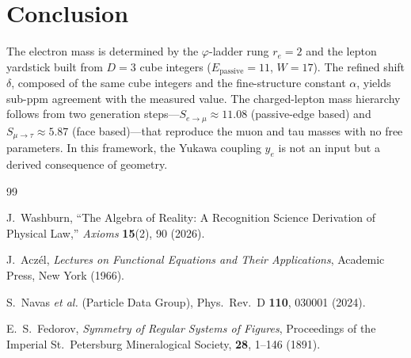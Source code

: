\documentclass[12pt,a4paper]{article}
\theoremstyle{definition}
\theoremstyle{remark}
\begin{document}
\section{Conclusion}
\label{sec:conclusion}

The electron mass is determined by the $\varphi$-ladder rung
$r_e = 2$ and the lepton yardstick built from $D = 3$ cube
integers ($E_{\mathrm{passive}} = 11$, $W = 17$).  The refined
shift $\delta$, composed of the same cube integers and the
fine-structure constant $\alpha$, yields sub-ppm agreement with
the measured value.  The charged-lepton mass hierarchy follows
from two generation steps---$S_{e \to \mu} \approx 11.08$
(passive-edge based) and $S_{\mu \to \tau} \approx 5.87$
(face based)---that reproduce the muon and tau masses with no
free parameters.  In this framework, the Yukawa coupling $y_e$
is not an input but a derived consequence of geometry.

\begin{thebibliography}{99}

J.~Washburn, ``The Algebra of Reality: A Recognition Science Derivation
of Physical Law,'' \emph{Axioms} \textbf{15}(2), 90 (2026).

J.~Acz\'el, \textit{Lectures on Functional Equations and Their Applications},
Academic Press, New York (1966).

S.~Navas \textit{et al.} (Particle Data Group),
Phys.\ Rev.\ D \textbf{110}, 030001 (2024).

E.~S.~Fedorov, \textit{Symmetry of Regular Systems of Figures},
Proceedings of the Imperial St.~Petersburg Mineralogical Society,
\textbf{28}, 1--146 (1891).

\end{thebibliography}
\end{document}
